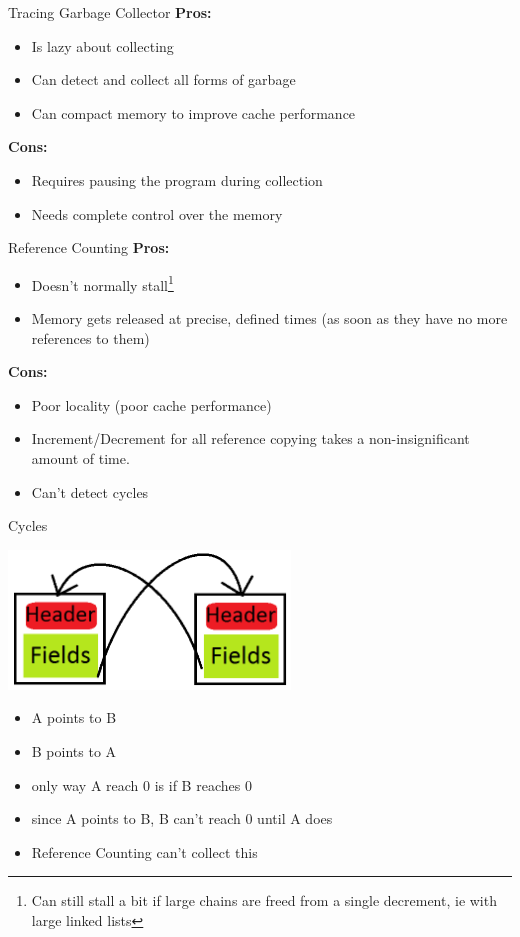\documentclass{beamer}
\begin{document}
\begin{frame}{Tracing Garbage Collector}
	\textbf{Pros:}
	\begin{itemize}
		\item Is lazy about collecting
		\item Can detect and collect all forms of garbage
		\item Can compact memory to improve cache performance
	\end{itemize}
	\textbf{Cons:}
	\begin{itemize}
		\item Requires pausing the program during collection
		\item Needs complete control over the memory
	\end{itemize}
\end{frame}

\begin{frame}{Reference Counting}
	\textbf{Pros:}
	\begin{itemize}
		\item Doesn't normally stall\footnote{Can still stall a bit if large chains are freed from a single decrement, ie with large linked lists}
		\item Memory gets released at precise, defined times (as soon as they have no more references to them)
	\end{itemize}
	\textbf{Cons:}
	\begin{itemize}
		\item Poor locality (poor cache performance)
		\item Increment/Decrement for all reference copying takes a non-insignificant amount of time.
		\item Can't detect cycles
	\end{itemize}
\end{frame}


\begin{frame}{Cycles}
	\begin{center}
		\includegraphics[width=75mm]{graphics/cycles.png}
	\end{center}
	\begin{itemize}
		\item A points to B
		\item B points to A
		\item only way A reach 0 is if B reaches 0
		\item since A points to B, B can't reach 0 until A does
		\item Reference Counting can't collect this
	\end{itemize}
\end{frame}
\end{document}
